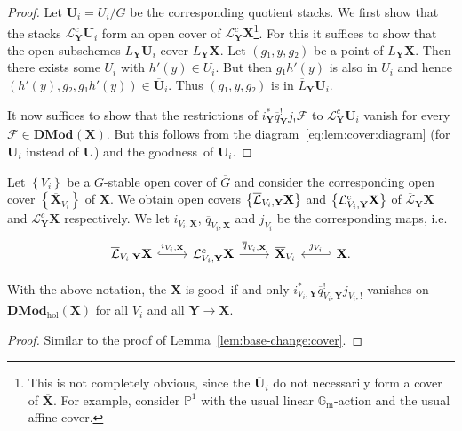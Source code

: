 \documentclass[english]{ck-article}
\newcommand\cat{\mathbf}
\newcommand\catDMod[2][]{\cat{DMod}_{#1}(#2)}
\newcommand\catDModHol[1]{\catDMod[\mathrm{hol}]{#1}}
\let\stack\mathbf
\newcommand\ps[2][]{\mathbb P^{#2}_{#1}}
\newcommand\Gm{\mathbb{G}_{\mathrm{m}}}
\let\sheaf\mathcal
\let\bar\overline
\newcommand\ΓdR{Γ_{\mkern-4mu\dR}}
\newcommand\Γsub[1]{\Gamma_{\mkern-3mu#1}}
\newcommand\barΓsub[1]{\bar{\Gamma}_{\mkern-3mu#1}}
\newcommand\cls[1]{\overline{\mathcal{L}} #1}
\newcommand\clsY[1]{\overline{\mathcal{L}}_{\stack Y} #1}
\newcommand\lsc[1]{\mathcal{L}^c #1}
\newcommand\lscY[1]{\mathcal{L}_{\stack Y}^c #1}
\newcommand\schemecls[2][]{\overline{L}^{#1}#2}
\newcommand\schemeclsY[2][]{\schemecls[#1]{_{\stack Y}#2}}
\newcommand\goodstack{good}
\newcommand\goodness{goodness}
\begin{document}
\begin{proof}
    Let $\stack U_i = U_i/G$ be the corresponding quotient stacks.
    We first show that the stacks $\lscY{\stack U_i}$ form an open cover of $\lscY{\stack X}$\footnote{
        This is not completely obvious, since the $\bar{\stack U}_i$ do not necessarily form a cover of $\bar{\stack X}$.
        For example, consider $\ps1$ with the usual linear $\Gm$-action and the usual affine cover.
    }.
    For this it suffices to show that the open subschemes $\schemeclsY \stack U_i$ cover $\schemeclsY \stack X$.
    Let $(g₁, y, g₂)$ be a point of $\schemeclsY \stack X$.
    Then there exists some $U_i$ with $h'(y) ∈ U_i$.
    But then $g₁h'(y)$ is also in $U_i$ and hence $(h'(y), g₂, g₁h'(y)) ∈ \bar{\stack U}_i$.
    Thus $(g₁, y, g₂)$ is in $\schemeclsY \stack U_i$.

    It now suffices to show that the restrictions of $i_{\stack Y}^*\bar{q}_{\stack Y}^!j_! \sheaf F$ to $\lscY{\stack U_i}$ vanish for every $\sheaf F ∈ \catDMod{\stack X}$.
    But this follows from the diagram~\eqref{eq:lem:cover:diagram} (for $\stack U_i$ instead of $\stack U$) and the \goodness\ of $\stack U_i$.
\end{proof}

Let $\left\{V_i\right\}$ be a $G$-stable open cover of $\bar G$ and consider the corresponding open cover $\left\{\bar{\stack X}_{V_i}\right\}$ of $\stack X$.
We obtain open covers $\left\{\cls_{V_i,\stack Y} \stack X\right\}$ and $\left\{\lsc_{V_i,\stack Y} \stack X\right\}$ of $\clsY{\stack X}$ and $\lscY{\stack X}$ respectively.
We let $i_{V_i,\stack X}$, $\bar q_{V_i,\stack X}$ and $j_{V_i}$ be the corresponding maps, i.e.
\[
    \begin{tikzcd}
        \cls_{V_i,\stack Y} \stack X \arrow[hook]{r}{i_{V_i,\stack X}} &
        \lsc_{V_i,\stack Y} \stack X \arrow{r}{\bar q_{V_i,\stack X}} &
        \bar{\stack X}_{V_i} \arrow[hookleftarrow]{r}{j_{V_i}} &
        \stack X.
    \end{tikzcd}
\]

\begin{Lem}\label{lem:base-change:cover-by-relative-compactifications}
    With the above notation, the $\stack X$ is \goodstack\ if and only $i_{V_i,\stack Y}^* \bar q_{V_i,\stack Y}^! j_{V_i,!}$ vanishes on $\catDModHol{\stack X}$ for all $V_i$ and all $\stack Y → \stack X$.
\end{Lem}

\begin{proof}
    Similar to the proof of Lemma~\ref{lem:base-change:cover}.
\end{proof}
\end{document}
